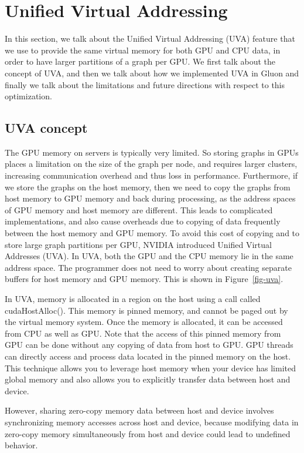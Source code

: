 \section{Unified Virtual Addressing}
\label{sec-uva}

In this section, we talk about the Unified Virtual Addressing (UVA) feature that we use to provide the same virtual memory for both GPU and CPU data, in order to have larger partitions of a graph per GPU. We first talk about the concept of UVA, and then we talk about how we implemented UVA in Gluon and finally we talk about the limitations and future directions with respect to this optimization. 

\subsection{UVA concept}

The GPU memory on servers is typically very limited. So storing graphs in GPUs places a limitation on the size of the graph per node, and requires larger clusters, increasing communication overhead and thus loss in performance. Furthermore, if we store the graphs on the host memory, then we need to copy the graphs from host memory to GPU memory and back during processing, as the address spaces of GPU memory and host memory are different. This leads to complicated implementations, and also cause overheads due to copying of data frequently between the host memory and GPU memory. To avoid this cost of copying and to store large graph partitions per GPU, NVIDIA introduced Unified Virtual Addresses (UVA). In UVA, both the GPU and the CPU memory lie in the same address space. The programmer does not need to worry about creating separate buffers for host memory and GPU memory. This is shown in Figure~\ref{fig-uva}. 

In UVA, memory is allocated in a region on the host using a call called cudaHostAlloc(). This memory is pinned memory, and cannot be paged out by the virtual memory system. Once the memory is allocated, it can be accessed from CPU as well as GPU. Note that the access of this pinned memory from GPU can be done without any copying of data from host to GPU. GPU threads can directly access and process data located in the pinned memory on the host. This technique allows you to leverage host memory when your device has limited global memory and also allows you to explicitly transfer data between host and device. 

However, sharing zero-copy memory data between host and device involves synchronizing memory accesses across host and device, because modifying data in zero-copy memory simultaneously from host and device could lead to undefined behavior. 


